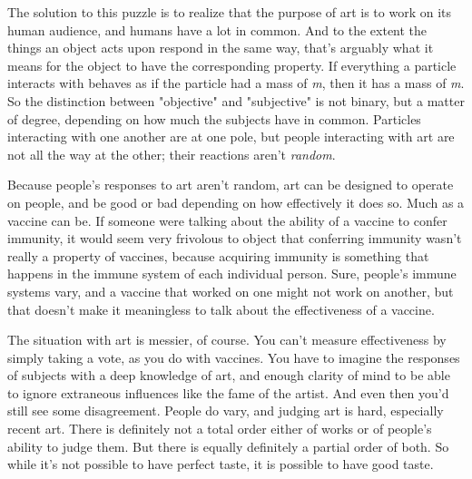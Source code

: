 The solution to this puzzle is to
                  realize that the purpose of art is to work on its human
                  audience, and humans have a lot in common. And to the extent
                  the things an object acts upon respond in the same way, that's
                  arguably what it means for the object to have the
                  corresponding property. If everything a particle interacts
                  with behaves as if the particle had a mass of \emph{m}, then
                  it has a mass of \emph{m}. So the distinction between
                  "objective" and "subjective" is not binary, but a matter of
                  degree, depending on how much the subjects have in common.
                  Particles interacting with one another are at one pole, but
                  people interacting with art are not all the way at the other;
                  their reactions aren't \emph{random}.

Because
                  people's responses to art aren't random, art can be designed
                  to operate on people, and be good or bad depending on how
                  effectively it does so. Much as a vaccine can be. If someone
                  were talking about the ability of a vaccine to confer
                  immunity, it would seem very frivolous to object that
                  conferring immunity wasn't really a property of vaccines,
                  because acquiring immunity is something that happens in the
                  immune system of each individual person. Sure, people's immune
                  systems vary, and a vaccine that worked on one might not work
                  on another, but that doesn't make it meaningless to talk about
                  the effectiveness of a vaccine.

The situation with
                  art is messier, of course. You can't measure effectiveness by
                  simply taking a vote, as you do with vaccines. You have to
                  imagine the responses of subjects with a deep knowledge of
                  art, and enough clarity of mind to be able to ignore
                  extraneous influences like the fame of the artist. And even
                  then you'd still see some disagreement. People do vary, and
                  judging art is hard, especially recent art. There is
                  definitely not a total order either of works or of people's
                  ability to judge them. But there is equally definitely a
                  partial order of both. So while it's not possible to have
                  perfect taste, it is possible to have good taste.








